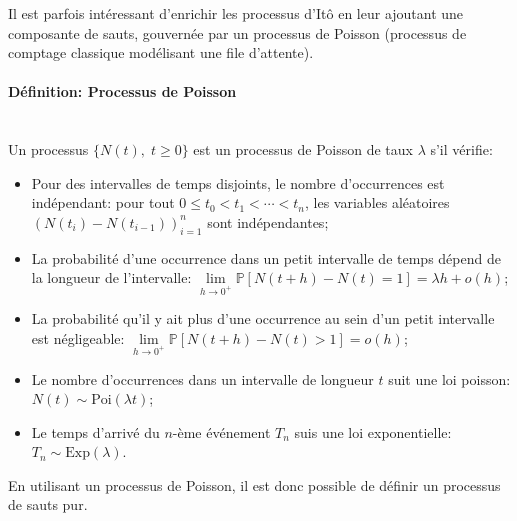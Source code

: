 Il est parfois intéressant d'enrichir les processus d'Itô en leur ajoutant une composante de sauts, gouvernée par un processus de Poisson (processus de comptage classique modélisant une file d'attente).

\paragraph{Définition: Processus de Poisson}\mbox{}\\
Un processus $\{N(t),\;t\geq0\}$ est un processus de Poisson de taux $\lambda$ s'il vérifie:
\begin{itemize}
    \item Pour des intervalles de temps disjoints, le nombre d'occurrences est indépendant: pour tout $0 \leq t_0 < t_1 < \cdots < t_n$, les variables aléatoires ${\left(N(t_i) - N(t_{i-1})\right)}_{i=1}^n$ sont indépendantes;
    \item La probabilité d'une occurrence dans un petit intervalle de temps dépend de la longueur de l'intervalle: $\underset{h\to0^+}{\lim}\mathds{P}[N(t+h)-N(t)=1]=\lambda h+o(h)$;
    \item La probabilité qu'il y ait plus d'une occurrence au sein d'un petit intervalle est négligeable: $\underset{h\to0^+}{\lim}\mathds{P}[N(t+h)-N(t)>1]=o(h)$;
    \item Le nombre d'occurrences dans un intervalle de longueur $t$ suit une loi poisson: $N(t)\sim \text{Poi}(\lambda t)$;
    \item Le temps d'arrivé du $n$-ème événement $T_n$ suis une loi exponentielle: $T_n\sim\text{Exp}(\lambda)$.
\end{itemize}

En utilisant un processus de Poisson, il est donc possible de définir un processus de sauts pur.

